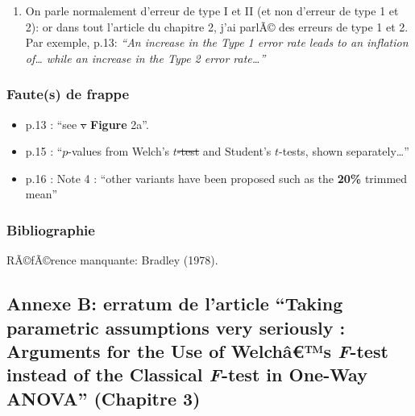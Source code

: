 \begin{appendix}
\begin{enumerate}
\def\labelenumi{\arabic{enumi})}
\setcounter{enumi}{3}
\tightlist
\item
  On parle normalement d'erreur de type I et II (et non d'erreur de type
  1 et 2): or dans tout l'article du chapitre 2, j'ai parlÃ© des erreurs
  de type 1 et 2. Par exemple, p.13: \emph{``An increase in the Type 1
  error rate leads to an inflation of\ldots{} while an increase in the
  Type 2 error rate\ldots{}''}
\end{enumerate}

\hypertarget{fautes-de-frappe}{%
\subsubsection{Faute(s) de frappe}\label{fautes-de-frappe}}

\begin{itemize}
\tightlist
\item
  p.13 : ``see \sout{v} \textbf{Figure} 2a''.
\item
  p.15 : ``\(p\)-values from Welch's \sout{\(t\)-test} and Student's
  \(t\)-tests, shown separately\ldots{}''
\item
  p.16 : Note 4 : ``other variants have been proposed such as the
  \textbf{20\%} trimmed mean''
\end{itemize}

\hypertarget{bibliographie}{%
\subsubsection{Bibliographie}\label{bibliographie}}

RÃ©fÃ©rence manquante: Bradley (1978).

\newpage

\hypertarget{annexe-b-erratum-de-larticle-taking-parametric-assumptions-very-seriously-arguments-for-the-use-of-welchuxe2s-f-test-instead-of-the-classical-f-test-in-one-way-anova-chapitre-3}{%
\subsection{\texorpdfstring{Annexe B: erratum de l'article ``Taking
parametric assumptions very seriously : Arguments for the Use of
Welchâ€™s \emph{F}-test instead of the Classical \emph{F}-test in
One-Way ANOVA'' (Chapitre
3)}{Annexe B: erratum de l'article ``Taking parametric assumptions very seriously : Arguments for the Use of Welchâ€™s F-test instead of the Classical F-test in One-Way ANOVA'' (Chapitre 3)}}\label{annexe-b-erratum-de-larticle-taking-parametric-assumptions-very-seriously-arguments-for-the-use-of-welchuxe2s-f-test-instead-of-the-classical-f-test-in-one-way-anova-chapitre-3}}


\end{appendix}
